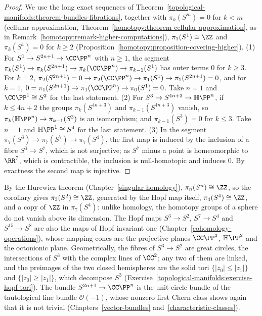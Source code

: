 \begin{proof}
We use the long exact sequences of Theorem~\ref{topological-manifolds:theorem-bundles-fibrations}, together with $\pi_k(S^m) = 0$ for $k < m$ (cellular approximation,
Theorem~\ref{homotopy:theorem-cellular-approximation}, as in Remark~\ref{homotopy:remark-higher-computations}), $\pi_1(S^1) \cong \ZZ$ and $\pi_k(S^1) = 0$ for $k \geq 2$
(Proposition~\ref{homotopy:proposition-covering-higher}). (1) For $S^1 \to S^{2n+1} \to \CC\PP^n$ with $n \geq 1$, the segment $\pi_k(S^1) \to \pi_k(S^{2n+1}) \to \pi_k(\CC\PP^n) \to \pi_{k-1}(S^1)$ has outer terms $0$ for $k \geq 3$.
For $k = 2$, $\pi_2(S^{2n+1}) = 0 \to \pi_2(\CC\PP^n) \to \pi_1(S^1) \to \pi_1(S^{2n+1}) = 0$, and for $k = 1$, $0 = \pi_1(S^{2n+1}) \to \pi_1(\CC\PP^n) \to \pi_0(S^1) = 0$. Take $n = 1$ and
$\CC\PP^1 \cong S^2$ for the last statement. (2) For $S^3 \to S^{4n+3} \to \mathbb{H}\PP^n$, if $k \leq 4n + 2$ the groups $\pi_k(S^{4n+3})$ and $\pi_{k-1}(S^{4n+3})$ vanish, so $\pi_k(\mathbb{H}\PP^n) \to \pi_{k-1}(S^3)$ is an
isomorphism; and $\pi_{k-1}(S^3) = 0$ for $k \leq 3$. Take $n = 1$ and $\mathbb{H}\PP^1 \cong S^4$ for the last statement. (3) In the segment $\pi_7(S^3) \to \pi_7(S^7) \to \pi_7(S^4)$, the first map is induced by the inclusion of
a fibre $S^3 \to S^7$, which is not surjective; as $S^7$ minus a point is homeomorphic to $\RR^7$, which is contractible, the inclusion is null-homotopic and induces $0$. By exactness the second map is injective.
\end{proof}

By the Hurewicz theorem (Chapter~\ref{singular-homology}), $\pi_n(S^n) \cong \ZZ$, so the corollary gives $\pi_3(S^2) \cong \ZZ$, generated by the Hopf map itself, $\pi_4(S^4) \cong \ZZ$, and a copy of $\ZZ$ in
$\pi_7(S^4)$: unlike homology, the homotopy groups of a sphere do not vanish above its dimension. The Hopf maps $S^3 \to S^2$, $S^7 \to S^4$ and $S^{15} \to S^8$ are also the maps of Hopf invariant one
(Chapter~\ref{cohomology-operations}), whose mapping cones are the projective planes $\CC\PP^2$, $\mathbb{H}\PP^2$ and the octonionic plane. Geometrically, the fibres of $S^3 \to S^2$ are great circles, the
intersections of $S^3$ with the complex lines of $\CC^2$; any two of them are linked, and the preimages of the two closed hemispheres are the solid tori $\{|z_0| \leq |z_1|\}$ and $\{|z_0| \geq |z_1|\}$, which
decompose $S^3$ (Exercise~\ref{topological-manifolds:exercise-hopf-tori}). The bundle $S^{2n+1} \to \CC\PP^n$ is the unit circle bundle of the tautological line bundle $\mathcal{O}(-1)$, whose nonzero
first Chern class shows again that it is not trivial (Chapters~\ref{vector-bundles} and~\ref{characteristic-classes}).

